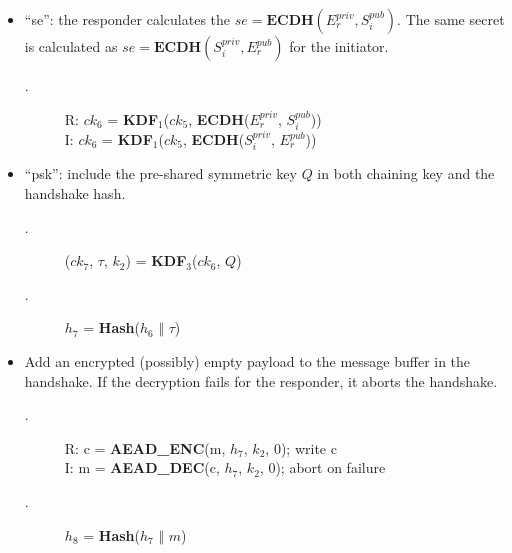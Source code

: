 \begin{enumerate} [start = \value{msg}]
\begin{itemize}
  \item ``se'':  the responder calculates the $se = \textbf{ECDH}(E^{priv}_r, S^{pub}_i)$. The
  same secret is calculated as $se = \textbf{ECDH}(S^{priv}_i, E^{pub}_r)$ for the initiator.
    \begin{center}
      \begin{varwidth}{\textwidth}
        \begin{description}
        \item[\textnormal{}.] 
              R: $ck_6$ = \textbf{KDF}$_1$($ck_5$, \textbf{ECDH}($E^{priv}_r$, $S^{pub}_i$)) \\
              I: $ck_6$ = \textbf{KDF}$_1$($ck_5$, \textbf{ECDH}($S^{priv}_i$, $E^{pub}_r$))
        \addtocounter{cnt}{1}
        \end{description}
      \end{varwidth}
    \end{center}

    \item ``psk'':  include the pre-shared symmetric key $Q$ in both chaining key and the
    handshake hash.
    \begin{center}
        \begin{varwidth}{\textwidth}
          \begin{description}
          \item[\textnormal{}.] ($ck_7$, $\tau$, $k_2$) = \textbf{KDF}$_3$($ck_6$, $Q$)
          \addtocounter{cnt}{1}
          \item[\textnormal{}.] $h_7$ = \textbf{Hash}($h_6$ $\Vert$ $\tau$)
          \addtocounter{cnt}{1}
          \end{description}
        \end{varwidth}
      \end{center}

    \item Add an encrypted (possibly) empty payload to the message buffer in the handshake. If the
    decryption fails for the responder, it aborts the handshake.
    \begin{center}
      \begin{varwidth}{\textwidth}
        \begin{description}
        \item[\textnormal{}.] 
              R: c = \textbf{AEAD{\_}ENC}(m, $h_7$, $k_2$, 0); write c \\
              I: m = \textbf{AEAD{\_}DEC}(c, $h_7$, $k_2$, 0); abort on failure
        \addtocounter{cnt}{1}
        \item[\textnormal{}.] $h_8$ = \textbf{Hash}($h_7$ $\Vert$ $m$)
        \addtocounter{cnt}{1}
        \end{description}
      \end{varwidth}
    \end{center}
  \end{itemize}
  \end{enumerate}


